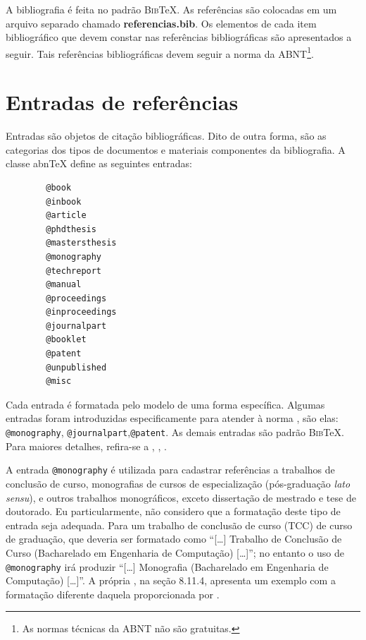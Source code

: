 \begin{apendicesenv}
    A bibliografia é feita no padrão \textsc{Bib}\TeX{}.
    As referências são colocadas em um arquivo separado chamado \textbf{referencias.bib}.
    Os elementos de cada item bibliográfico que devem constar nas referências bibliográficas são apresentados a seguir.
    Tais referências bibliográficas devem seguir a norma  da ABNT\footnote{As normas técnicas da ABNT não são gratuitas.}.

    \section{Entradas de referências}
    \label{sec_entradas_de_referencias}

    Entradas são objetos de citação bibliográficas.
    Dito de outra forma, são as categorias dos tipos de documentos e materiais componentes da bibliografia.
    A classe abn\TeX{} define as seguintes entradas:

    \begin{verbatim}
        @book
        @inbook
        @article
        @phdthesis
        @mastersthesis
        @monography
        @techreport
        @manual
        @proceedings
        @inproceedings
        @journalpart
        @booklet
        @patent
        @unpublished
        @misc
    \end{verbatim}

    Cada entrada é formatada pelo modelo de uma forma específica.
    Algumas entradas foram introduzidas especificamente para atender à norma , são elas: \verb|@monography|, \verb|@journalpart|,\verb|@patent|.
    As demais entradas são padrão \textsc{Bib}\TeX{}.
    Para maiores detalhes, refira-se a , , .

    A entrada \verb|@monography| é utilizada para cadastrar referências a trabalhos de conclusão de curso, monografias de cursos de especialização (pós-graduação \textit{lato sensu}), e outros trabalhos monográficos, exceto dissertação de mestrado e tese de doutorado.
    Eu particularmente, não considero que a formatação deste tipo de entrada seja adequada.
    Para um trabalho de conclusão de curso (TCC) de curso de graduação, que deveria ser formatado como ``[\ldots] Trabalho de Conclusão de Curso (Bacharelado em Engenharia de Computação) [\ldots]''; no entanto o uso de \verb|@monography| irá produzir ``[\ldots] Monografia (Bacharelado em Engenharia de Computação) [\ldots]''.
    A própria  , na seção 8.11.4, apresenta um exemplo com a formatação diferente daquela proporcionada por .


\end{apendicesenv}
